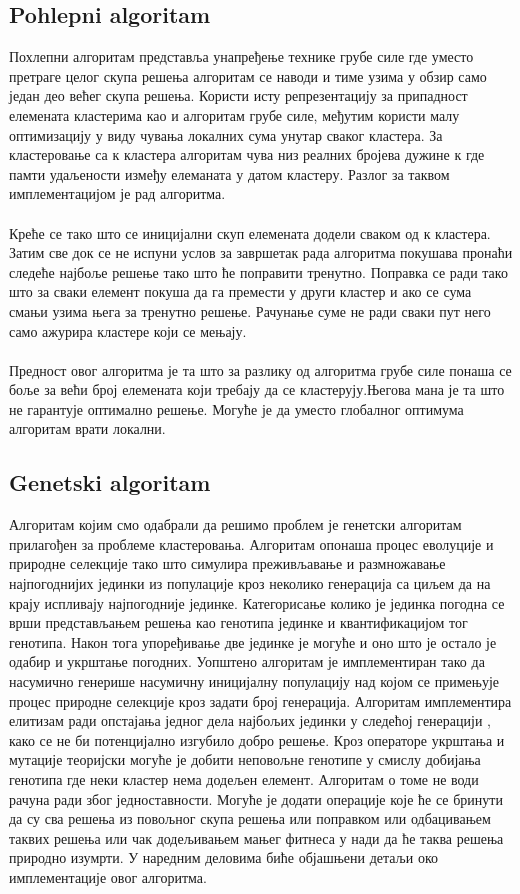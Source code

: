 \documentclass{article}
\begin{document}
\subsection{Pohlepni algoritam}
Похлепни алгоритам представља унапређење технике грубе силе где уместо претраге целог скупа решења алгоритам се наводи и тиме узима у обзир само један део већег скупа решења.
Користи исту репрезентацију за припадност елемената кластерима као и алгоритам грубе силе, међутим користи малу оптимизацију у виду чувања локалних сума унутар сваког кластера.
За кластеровање са к кластера алгоритам чува низ реалних бројева дужине к где памти удаљености између елеманата у датом кластеру.
Разлог за таквом имплементацијом је рад алгоритма.
\\\\Креће се тако што се иницијални скуп елемената додели сваком од к кластера.
Затим све док се не испуни услов за завршетак рада алгоритма покушава пронаћи следеће најбоље решење тако што ће поправити тренутно.
Поправка се ради тако што за сваки елемент покуша да га премести у други кластер и ако се сума смањи узима њега за тренутно решење.
Рачунање суме не ради сваки пут него само ажурира кластере који се мењају.
\\\\Предност овог алгоритма је та што за разлику од алгоритма грубе силе понаша се боље за већи број елемената који требају да се кластерују.Његова мана је та што не гарантује оптимално решење. Могуће је да уместо глобалног оптимума алгоритам врати локални.
\subsection{Genetski algoritam}
Алгоритам којим смо одабрали да решимо проблем је генетски алгоритам прилагођен за проблеме кластеровања.
Алгоритам опонаша процес еволуције и природне селекције тако што симулира преживљавање и размножавање најпогоднијих јединки из популације кроз неколико генерација са циљем да на крају испливају најпогодније јединке.
Категорисање колико је јединка погодна се врши представљањем решења као генотипа јединке и квантификацијом тог генотипа.
Након тога упоређивање две јединке је могуће и оно што је остало је одабир и укрштање погодних.
Уопштено алгоритам је имплементиран тако да насумично генерише насумичну иницијалну популацију над којом се примењује процес природне селекције кроз задати број генерација.
Алгоритам имплементира елитизам ради опстајања једног дела најбољих јединки у следећој генерацији , како се не би потенцијално изгубило добро решење.
Кроз операторе укрштања и мутације теоријски могуће је добити неповољне генотипе у смислу добијања генотипа где неки кластер нема додељен елемент.
Алгоритам о томе не води рачуна ради због једноставности.
Могуће је додати операције које ће се бринути да су сва решења из повољног скупа решења или поправком или одбацивањем таквих решења или чак додељивањем мањег фитнеса у нади да ће таква решења природно изумрти.
У наредним деловима биће објашњени детаљи око имплементације овог алгоритма.
\end{document}
